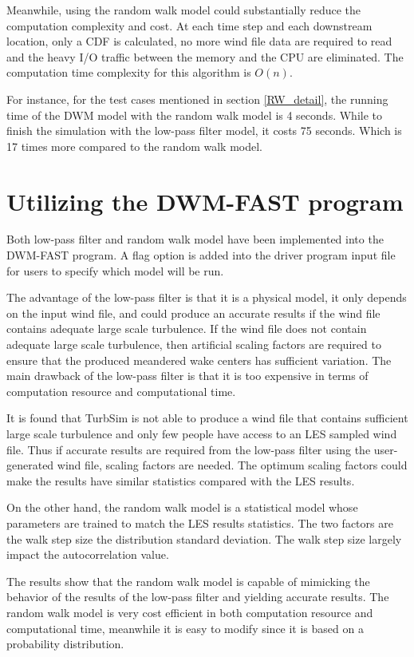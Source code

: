\documentclass{umthesis}
\begin{document}
Meanwhile, using the random walk model could substantially reduce the computation complexity and cost. At each time step and each downstream location, only a CDF is calculated, no more wind file data are required to read and the heavy I/O traffic between the memory and the CPU are eliminated. The computation time complexity for this algorithm is $O(n)$.

For instance, for the test cases mentioned in section \ref{RW_detail}, the running time of the DWM model with the random walk model is 4 seconds. While to finish the simulation with the low-pass filter model, it costs 75 seconds. Which is 17 times more compared to the random walk model.

\section{Utilizing the DWM-FAST program}\label{sec:meandering_recom}
Both low-pass filter and random walk model have been implemented into the DWM-FAST program. A flag option is added into the driver program input file for users to specify which model will be run.

The advantage of the low-pass filter is that it is a physical model, it only depends on the input wind file, and could produce an accurate results if the wind file contains adequate large scale turbulence. If the wind file does not contain adequate large scale turbulence, then artificial scaling factors are required to ensure that the produced meandered wake centers has sufficient variation. The main drawback of the low-pass filter is that it is too expensive in terms of computation resource and computational time. 

It is found that TurbSim is not able to produce a wind file that contains sufficient large scale turbulence and only few people have access to an LES sampled wind file. Thus if accurate results are required from the low-pass filter using the user-generated wind file, scaling factors are needed. The optimum scaling factors could make the results have similar statistics compared with the LES results.

On the other hand, the random walk model is a statistical model whose parameters are trained to match the LES results statistics. The two factors are the walk step size the distribution standard deviation. The walk step size largely impact the autocorrelation value. 

The results show that the random walk model is capable of mimicking the behavior of the results of the low-pass filter and yielding accurate results. The random walk model is very cost efficient in both computation resource and computational time, meanwhile it is easy to modify since it is based on a probability distribution.
\end{document}
